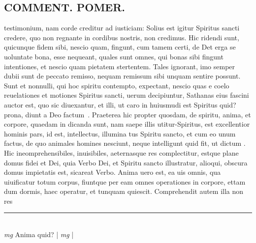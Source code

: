 \documentclass{article}
\begin{document}
\begin{pages}
\section*{COMMENT. POMER.  }\pstart testimonium, nam corde creditur ad iusticiam: Solius est igitur Spiritus sancti credere, quo non regnante in cordibus nostris, non credimus. Hic ridendi sunt, quicunque fidem sibi, nescio quam, fingunt, cum tamem certi, de Det erga se uoluntate bona, esse nequeant, quales sunt omnes, qui bonas sibi fingunt intentiones, et nescio quam pietatem stertentem. Tales ignorant, imo semper dubii sunt de peccato remisso, nequam remissum sibi unquam sentire possunt. Sunt et nonnulli, qui hoc spiritu contempto, expectant, nescio quas e coelo reuelationes et motiones Spiritus sancti, uerum decipiuntur, Sathanas eius fascini auctor est, quo sic diuexantur, et illi, ut caro in huiusmudi est Spiritus quid? prona, diunt a Deo factum . Praeterea hic propter quosdam, de spiritu, anima, et corpore, quaedam in dicanda sunt, nam saepe illis utitur-Spiritus, est excellentior hominis pars, id est, intellectus, illumina tus Spiritu sancto, et cum eo unum factus, de quo animales homines nesciunt, neque intelligunt quid fit, ut dictum . Hic ineomprehensibiles, inuisibiles, aeternasque res complectitur, estque plane domus fidei et Dei, quia Verbo Dei, et Spiritu sancto illustratur, alioqui, obscura domus impietatis est, sicareat Verbo. Anima uero est, ea uis omnis, qua uiuificatur totum corpus, fiuntque per eam omnes operationes in corpore, ettam dum dormis, haec operatur, et tunquam quiescit. Comprehendit autem illa non res  \pend
\vspace{0.5cm}\noindent
\vspace{0.2cm}\rule{1cm}{0.2pt}\\ 
\hspace{0.2cm}\textit{mg}
\footnotesize Anima quid? 
\normalsize| 
\hspace{0.2cm}\textit{mg}
\footnotesize 
\normalsize| 

\end{pages}
\end{document}
